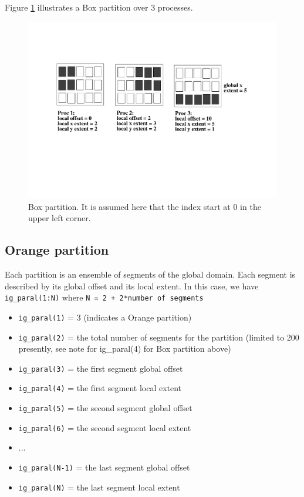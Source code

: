 Figure \ref{box_partition} illustrates a Box partition over 3
processes.
 
\begin{figure}
  \includegraphics[scale=.6]{figures/box_new}
  \caption{Box partition. It is assumed here that the index start at 0
    in the upper left corner.}
  \label{box_partition}
\end{figure}
  
\subsection{Orange partition}

Each partition is an ensemble of segments of the global domain. Each
segment is described by its global offset and its local extent.  In
this case, we have {\tt ig\_paral(1:N)} where {\tt N = 2 + 2*number of
  segments}

\begin{itemize}
\item {\tt ig\_paral(1)} = 3 (indicates a Orange partition)
\item {\tt ig\_paral(2)} = the total number of segments for the
  partition (limited to 200 presently, see note for ig\_paral(4) for
  Box partition above)
\item {\tt ig\_paral(3)} = the first segment global offset
\item {\tt ig\_paral(4)} = the first segment local extent
\item {\tt ig\_paral(5)} = the second segment global offset
\item {\tt ig\_paral(6)} = the second segment local extent
\item ...
\item {\tt ig\_paral(N-1)} = the last segment global offset
\item {\tt ig\_paral(N)} = the last segment local extent
\end{itemize}

